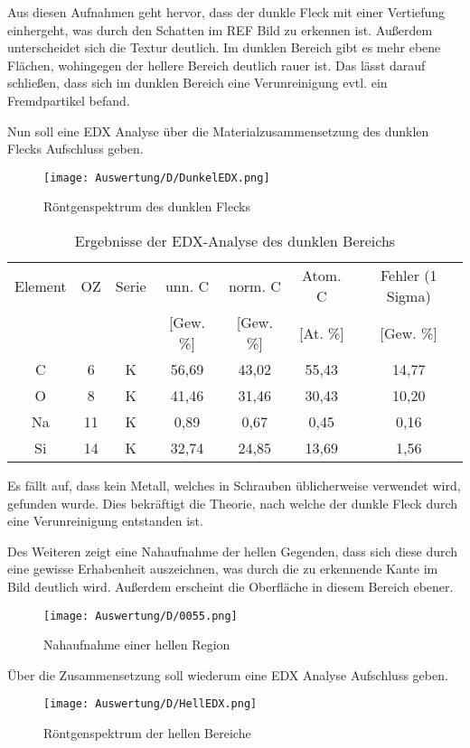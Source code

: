 Aus diesen Aufnahmen geht hervor, dass der dunkle Fleck mit einer Vertiefung einhergeht, was durch den Schatten im REF Bild zu erkennen ist. Außerdem unterscheidet sich die Textur deutlich. Im dunklen Bereich gibt es mehr ebene Flächen, wohingegen der hellere Bereich deutlich rauer ist. Das lässt darauf schließen, dass sich im dunklen Bereich eine Verunreinigung evtl. ein Fremdpartikel befand.

\newpage
Nun soll eine EDX Analyse über die Materialzusammensetzung des dunklen Flecks Aufschluss geben.
\begin{figure}[h]
    \centering
    \texttt{[image: Auswertung/D/DunkelEDX.png]}
    \caption{Röntgenspektrum des dunklen Flecks}
\end{figure}


\begin{table}[h]
    \centering
    \begin{tabular}{c|c|c|c|c|c|c}
        Element & OZ &Serie& unn. C & norm. C &  Atom. C  & Fehler (1 Sigma) \\
         & & & [Gew. \%] & [Gew. \%] & [At. \%] & [Gew. \%] \\
        \hline\hline
        C & 6 & K & 56,69 & 43,02 & 55,43 & 14,77\\
        O & 8 & K & 41,46 & 31,46 & 30,43 & 10,20\\
        Na & 11 & K & 0,89 & 0,67 & 0,45 & 0,16\\
        Si & 14 & K & 32,74 & 24,85 & 13,69 & 1,56
    \end{tabular}
    \caption{Ergebnisse der EDX-Analyse des dunklen Bereichs}
\end{table}
Es fällt auf, dass kein Metall, welches in Schrauben üblicherweise verwendet wird, gefunden wurde. Dies bekräftigt die Theorie, nach welche der dunkle Fleck durch eine Verunreinigung entstanden ist.

\newpage
Des Weiteren zeigt eine Nahaufnahme der hellen Gegenden, dass sich diese durch eine gewisse Erhabenheit auszeichnen, was durch die zu erkennende Kante im Bild deutlich wird. Außerdem erscheint die Oberfläche in diesem Bereich ebener.
\begin{figure}[h]
    \centering
    \texttt{[image: Auswertung/D/0055.png]}
    \caption{Nahaufnahme einer hellen Region}
\end{figure}

\newpage
Über die Zusammensetzung soll wiederum eine EDX Analyse Aufschluss geben.
\begin{figure}[h]
    \centering
    \texttt{[image: Auswertung/D/HellEDX.png]}
    \caption{Röntgenspektrum der hellen Bereiche}
\end{figure}



